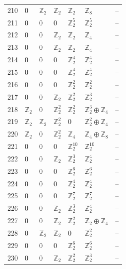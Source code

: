 \documentclass[10pt]{article}
\begin{document}
\begin{longtable}{rlllllr}
210 & $0$ & $\mathbb{Z}_{2}$ & $\mathbb{Z}_{2}$ & $\mathbb{Z}_{2}$ & $\mathbb{Z}_{8}$ & -- \\
211 & $0$ & $0$ & $0$ & $\mathbb{Z}_{2}^{5}$ & $\mathbb{Z}_{2}^{5}$ & -- \\
212 & $0$ & $0$ & $\mathbb{Z}_{2}$ & $\mathbb{Z}_{2}$ & $\mathbb{Z}_{4}$ & -- \\
213 & $0$ & $0$ & $\mathbb{Z}_{2}$ & $\mathbb{Z}_{2}$ & $\mathbb{Z}_{4}$ & -- \\
214 & $0$ & $0$ & $0$ & $\mathbb{Z}_{2}^{4}$ & $\mathbb{Z}_{2}^{4}$ & -- \\
215 & $0$ & $0$ & $0$ & $\mathbb{Z}_{2}^{4}$ & $\mathbb{Z}_{2}^{4}$ & -- \\
216 & $0$ & $0$ & $0$ & $\mathbb{Z}_{2}^{2}$ & $\mathbb{Z}_{2}^{2}$ & -- \\
217 & $0$ & $0$ & $\mathbb{Z}_{2}$ & $\mathbb{Z}_{2}^{2}$ & $\mathbb{Z}_{2}^{3}$ & -- \\
218 & $\mathbb{Z}_{2}$ & $0$ & $\mathbb{Z}_{2}^{2}$ & $\mathbb{Z}_{2}^{2}$ & $\mathbb{Z}_{2}^{3}\oplus \mathbb{Z}_{4}$ & -- \\
219 & $\mathbb{Z}_{2}$ & $\mathbb{Z}_{2}$ & $\mathbb{Z}_{2}^{2}$ & $0$ & $\mathbb{Z}_{2}^{2}\oplus \mathbb{Z}_{4}$ & -- \\
220 & $\mathbb{Z}_{2}$ & $0$ & $\mathbb{Z}_{2}^{2}$ & $\mathbb{Z}_{4}$ & $\mathbb{Z}_{4}\oplus \mathbb{Z}_{8}$ & -- \\
221 & $0$ & $0$ & $0$ & $\mathbb{Z}_{2}^{10}$ & $\mathbb{Z}_{2}^{10}$ & -- \\
222 & $0$ & $0$ & $\mathbb{Z}_{2}$ & $\mathbb{Z}_{2}^{3}$ & $\mathbb{Z}_{2}^{4}$ & -- \\
223 & $0$ & $0$ & $0$ & $\mathbb{Z}_{2}^{6}$ & $\mathbb{Z}_{2}^{6}$ & -- \\
224 & $0$ & $0$ & $0$ & $\mathbb{Z}_{2}^{4}$ & $\mathbb{Z}_{2}^{4}$ & -- \\
225 & $0$ & $0$ & $0$ & $\mathbb{Z}_{2}^{7}$ & $\mathbb{Z}_{2}^{7}$ & -- \\
226 & $0$ & $0$ & $\mathbb{Z}_{2}$ & $\mathbb{Z}_{2}^{3}$ & $\mathbb{Z}_{2}^{4}$ & -- \\
227 & $0$ & $0$ & $\mathbb{Z}_{2}$ & $\mathbb{Z}_{2}^{2}$ & $\mathbb{Z}_{2}\oplus \mathbb{Z}_{4}$ & -- \\
228 & $0$ & $\mathbb{Z}_{2}$ & $\mathbb{Z}_{2}$ & $0$ & $\mathbb{Z}_{2}^{2}$ & -- \\
229 & $0$ & $0$ & $0$ & $\mathbb{Z}_{2}^{6}$ & $\mathbb{Z}_{2}^{6}$ & -- \\
230 & $0$ & $0$ & $\mathbb{Z}_{2}$ & $\mathbb{Z}_{2}^{2}$ & $\mathbb{Z}_{2}^{3}$ & -- \\
\end{longtable}
\end{document}
